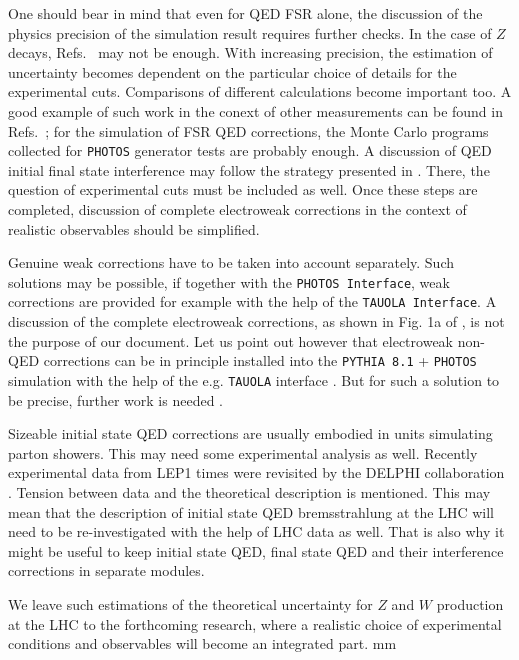 \documentclass[]{Photos_interface_design}
\begin{document}
One should bear in mind that even for QED FSR alone, the discussion of the physics 
precision of the simulation result requires further checks. In the case of 
$Z$ decays, Refs.~\cite{Golonka:2005pn,Golonka:2006tw} may not be enough.
With increasing precision, the estimation of uncertainty becomes dependent on 
the particular choice of details for the experimental cuts. Comparisons of different
calculations become important too. A good example of such work in the conext of 
other measurements can be found in Refs.~\cite{Jadach:1995pd,Arbuzov:1996eq}; 
for the simulation of 
FSR QED corrections, the Monte Carlo programs collected for {\tt PHOTOS} generator 
tests are probably enough. 
A discussion of QED initial final state interference may follow the strategy presented
in \cite{Jadach:1999gz}. There, the question of experimental cuts must be included 
as well. Once these steps are completed, discussion 
of complete electroweak corrections in the context of realistic observables should 
be simplified.



Genuine weak corrections have to be taken into account separately.
Such solutions may be possible,  if together with the {\tt PHOTOS Interface},
 weak corrections are provided for example with the help of the {\tt TAUOLA Interface}.
A discussion
of the complete electroweak corrections, as shown in Fig. 1a of  \cite{Adam:2008ge},
is not the purpose of our document. Let us point out however that electroweak 
non-QED corrections can be in principle installed into the {\tt PYTHIA 8.1} + {\tt PHOTOS} simulation with 
the help of the e.g. {\tt TAUOLA} interface \cite{Davidson:2010rw}.
But for such a solution to be precise, further work is needed \cite{Bardin-private}.

Sizeable initial state QED corrections are usually embodied in  units 
simulating parton showers. This may need some experimental analysis as well. 
Recently experimental data from LEP1 times were revisited by the DELPHI collaboration \cite{Abdallah:2010tk}.
Tension between data and the theoretical description is 
mentioned. This may mean that the description of initial state QED bremsstrahlung 
at the LHC will need to be re-investigated with the help of LHC data as well.
That is also why it  might be useful to keep initial state QED, final state QED and their interference corrections in separate modules. 

We leave such estimations of the theoretical uncertainty for $Z$ and $W$ 
production at the LHC 
to the forthcoming research, where a realistic choice of experimental conditions and
observables 
will become an integrated part.  mm
\end{document}
